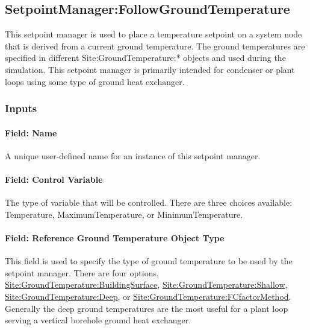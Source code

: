 \subsection{SetpointManager:FollowGroundTemperature}\label{setpointmanagerfollowgroundtemperature}

This setpoint manager is used to place a temperature setpoint on a system node that is derived from a current ground temperature. The ground temperatures are specified in different Site:GroundTemperature:* objects and used during the simulation. This setpoint manager is primarily intended for condenser or plant loops using some type of ground heat exchanger.

\subsubsection{Inputs}\label{inputs-22-004}

\paragraph{Field: Name}\label{field-name-22-002}

A unique user-defined name for an instance of this setpoint manager.

\paragraph{Field: Control Variable}\label{field-control-variable-16}

The type of variable that will be controlled. There are three choices available: Temperature, MaximumTemperature, or MinimumTemperature.

\paragraph{Field: Reference Ground Temperature Object Type}\label{field-reference-ground-temperature-object-type}

This field is used to specify the type of ground temperature to be used by the setpoint manager. There are four options, \hyperref[sitegroundtemperaturebuildingsurface]{Site:GroundTemperature:BuildingSurface}, \hyperref[sitegroundtemperatureshallow]{Site:GroundTemperature:Shallow}, \hyperref[sitegroundtemperaturedeep]{Site:GroundTemperature:Deep}, or \hyperref[sitegroundtemperaturefcfactormethod]{Site:GroundTemperature:FCfactorMethod}. Generally the deep ground temperatures are the most useful for a plant loop serving a vertical borehole ground heat exchanger.

